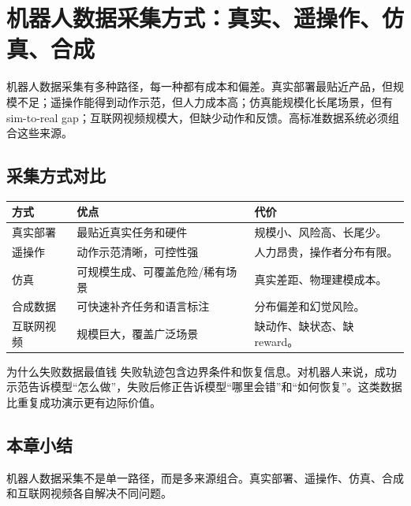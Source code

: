 \section{机器人数据采集方式：真实、遥操作、仿真、合成}

机器人数据采集有多种路径，每一种都有成本和偏差。真实部署最贴近产品，但规模不足；遥操作能得到动作示范，但人力成本高；仿真能规模化长尾场景，但有 sim-to-real gap；互联网视频规模大，但缺少动作和反馈。高标准数据系统必须组合这些来源。

\subsection{采集方式对比}

\noindent\begin{longtable}{p{}p{}p{}}
\toprule
方式 & 优点 & 代价 \\
\midrule
真实部署 & 最贴近真实任务和硬件 & 规模小、风险高、长尾少。 \\
遥操作 & 动作示范清晰，可控性强 & 人力昂贵，操作者分布有限。 \\
仿真 & 可规模生成、可覆盖危险/稀有场景 & 真实差距、物理建模成本。 \\
合成数据 & 可快速补齐任务和语言标注 & 分布偏差和幻觉风险。 \\
互联网视频 & 规模巨大，覆盖广泛场景 & 缺动作、缺状态、缺 reward。 \\
\bottomrule
\end{longtable}

\begin{knowledgebox}{为什么失败数据最值钱}
失败轨迹包含边界条件和恢复信息。对机器人来说，成功示范告诉模型“怎么做”，失败后修正告诉模型“哪里会错”和“如何恢复”。这类数据比重复成功演示更有边际价值。
\end{knowledgebox}

\subsection{本章小结}

机器人数据采集不是单一路径，而是多来源组合。真实部署、遥操作、仿真、合成和互联网视频各自解决不同问题。


